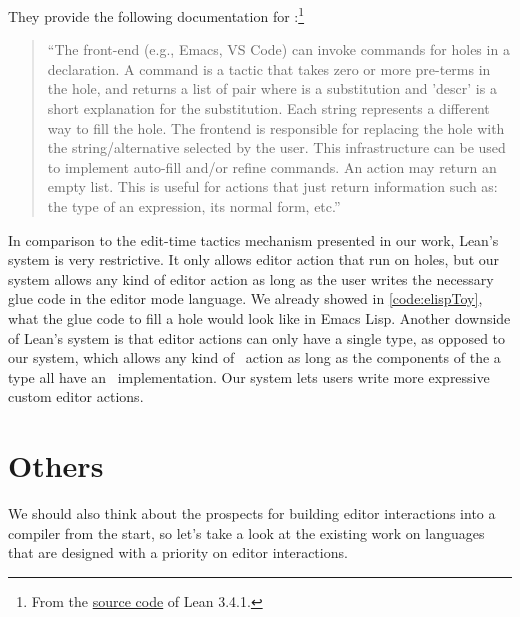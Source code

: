 They provide the following documentation for :\footnote{From
the \href{https://github.com/leanprover/lean/blob/17fe3decaf8ae236f0d0ff51ac8fd7f6940acdee/library/init/meta/hole\_command.lean}{source
code}
of Lean 3.4.1.}

\begin{quote}
  ``The front-end (e.g., Emacs, VS Code) can invoke commands for holes
   in a declaration. A command is a tactic that takes zero or
  more pre-terms in the hole, and returns a list of pair  where  is a substitution and 'descr' is a short explanation
  for the substitution.  Each string  represents a different way to fill
  the hole.  The frontend is responsible for replacing the hole with the
  string/alternative selected by the user.  This infrastructure can be used to
  implement auto-fill and/or refine commands. An action may return an empty
  list. This is useful for actions that just return information such as: the
  type of an expression, its normal form, etc.''
\end{quote}

In comparison to the edit-time tactics mechanism presented in our work, Lean's
system is very restrictive. It only allows editor action that run on holes, but
our system allows any kind of editor action as long as the user writes the
necessary glue code in the editor mode language. We already showed in
\autoref{code:elispToy}, what the glue code to fill a hole would look like in
Emacs Lisp. Another downside of Lean's system is that editor actions can only
have a single type, as opposed to our system, which allows any kind of
\Elab\ action as long as the components of the a type all have an
\Editorable\ implementation. Our system lets users write more expressive custom
editor actions.

\section{Others}

We should also think about the prospects for building editor interactions into
a compiler from the start, so let's take a look at the existing work on languages that are designed with a priority on editor interactions.

